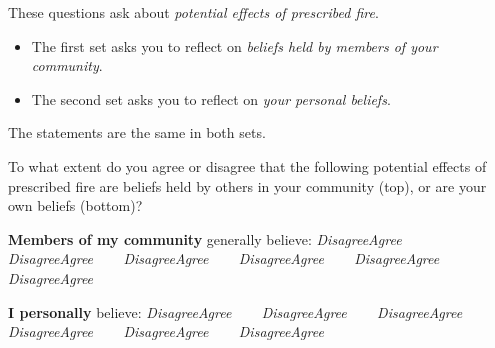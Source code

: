 \documentclass[
  english,
  checkmode = fill,
  ]{sdapsclassic}
\begin{document}
\begin{questionnaire}
\vspace{2em} 

These questions ask about \emph{potential effects of prescribed fire}. 

\begin{itemize}
\item The first set asks you to reflect on \emph{beliefs held by members of your community}. 
\item The second set asks you to reflect on \emph{your personal beliefs}. 
\end{itemize}
The statements are the same in both sets.

 To what extent do you agree or disagree that the following potential effects of prescribed fire are beliefs held by others in your community (top), or are your own beliefs (bottom)?
    
    
      \begin{markgroup}{\textbf{Members of my community} generally believe:}
        {\emph{Disagree}}{\emph{Agree}~~} {}~{}
        {\emph{Disagree}}{\emph{Agree}~~} {}~{}
        {\emph{Disagree}}{\emph{Agree}~~} {}~{}
        {\emph{Disagree}}{\emph{Agree}~~} {}~{}
        {\emph{Disagree}}{\emph{Agree}~~} {}~{}
        {\emph{Disagree}}{\emph{Agree}~~} {}~{}
      \end{markgroup}
    
      \begin{markgroup}{\textbf{I personally} believe:}
        {\emph{Disagree}}{\emph{Agree}~~} {}~{}
        {\emph{Disagree}}{\emph{Agree}~~} {}~{}
        {\emph{Disagree}}{\emph{Agree}~~} {}~{}
        {\emph{Disagree}}{\emph{Agree}~~} {}~{}
        {\emph{Disagree}}{\emph{Agree}~~} {}~{}
        {\emph{Disagree}}{\emph{Agree}~~} {}~{}
      \end{markgroup}
    

\end{questionnaire}
\end{document}
